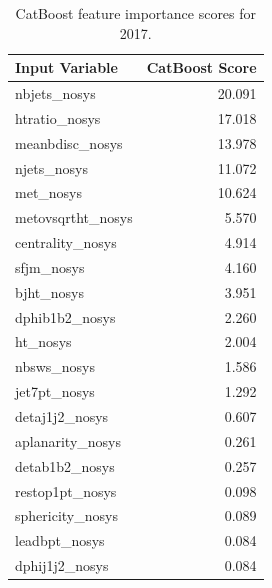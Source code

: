 \documentclass[twoside]{article}
\begin{document}
\begin{table}[htbp]
\centering
\begin{tabular}{l r}
\hline
\textbf{Input Variable} & \textbf{CatBoost Score} \\
\hline
nbjets\_nosys        & 20.091 \\
htratio\_nosys       & 17.018 \\
meanbdisc\_nosys     & 13.978 \\
njets\_nosys         & 11.072 \\
met\_nosys           & 10.624 \\
metovsqrtht\_nosys   & 5.570  \\
centrality\_nosys    & 4.914  \\
sfjm\_nosys          & 4.160  \\
bjht\_nosys          & 3.951  \\
dphib1b2\_nosys      & 2.260  \\
ht\_nosys            & 2.004  \\
nbsws\_nosys         & 1.586  \\
jet7pt\_nosys        & 1.292  \\
detaj1j2\_nosys      & 0.607  \\
aplanarity\_nosys    & 0.261  \\
detab1b2\_nosys      & 0.257  \\
restop1pt\_nosys     & 0.098  \\
sphericity\_nosys    & 0.089  \\
leadbpt\_nosys       & 0.084  \\
dphij1j2\_nosys      & 0.084  \\
\hline
\end{tabular}
\caption{CatBoost feature importance scores for 2017.}
\label{tab:catboost_scores_2017}
\end{table}
\end{document}
